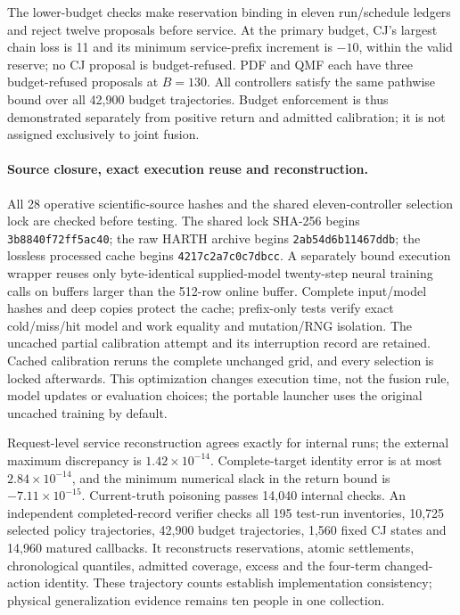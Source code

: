 \documentclass[10pt]{article}
\begin{document}
The lower-budget checks make reservation binding in eleven run/schedule
ledgers and reject twelve proposals before service. At the primary budget,
CJ's largest chain loss is 11 and its minimum service-prefix increment is
$-10$, within the valid reserve; no CJ proposal is budget-refused.
PDF and QMF each have three budget-refused proposals at $B=130$.
All controllers satisfy the same pathwise bound over all 42,900 budget
trajectories. Budget enforcement is thus demonstrated separately from
positive return and admitted calibration; it is not assigned exclusively
to joint fusion.

\paragraph{Source closure, exact execution reuse and reconstruction.}
All 28 operative scientific-source hashes and the shared eleven-controller
selection lock are checked before testing. The shared lock SHA-256 begins
\texttt{3b8840f72ff5ac40}; the raw HARTH archive begins
\texttt{2ab54d6b11467ddb}; the lossless processed cache begins
\texttt{4217c2a7c0c7dbcc}. A separately bound execution wrapper reuses only
byte-identical supplied-model twenty-step neural training calls on buffers
larger than the 512-row online buffer. Complete input/model hashes and deep
copies protect the cache; prefix-only tests verify exact cold/miss/hit
model and work equality and mutation/RNG isolation. The uncached partial
calibration attempt and its interruption record are retained. Cached
calibration reruns the complete unchanged grid, and every selection is
locked afterwards. This optimization changes execution time, not the
fusion rule, model updates or evaluation choices; the portable launcher
uses the original uncached training by default.

Request-level service reconstruction agrees exactly for internal runs;
the external maximum discrepancy is $1.42\times10^{-14}$. Complete-target
identity error is at most $2.84\times10^{-14}$, and the minimum numerical
slack in the return bound is $-7.11\times10^{-15}$. Current-truth poisoning
passes 14,040 internal checks. An independent completed-record verifier
checks all 195 test-run inventories, 10,725 selected policy trajectories,
42,900 budget trajectories, 1,560 fixed CJ states and 14,960 matured
callbacks. It reconstructs reservations, atomic settlements, chronological
quantiles, admitted coverage, excess and the four-term changed-action
identity. These trajectory counts establish implementation consistency;
physical generalization evidence remains ten people in one collection.
\end{document}
